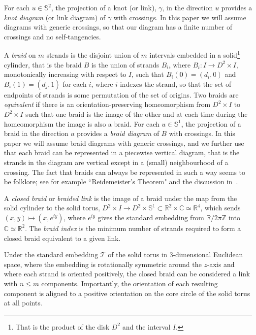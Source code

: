 \documentclass[twoside,leqno]{article}
\newcommand\Sp{\mathbb{S}}
\begin{document}
For each $u \in \Sp^2$, the projection of a knot (or link), $\gamma$, in the direction $u$ provides a \emph{knot diagram} (or link diagram) of $\gamma$ with crossings.  In this paper we will assume diagrams with generic crossings, so that our diagram has a finite number of crossings and no self-tangencies.


A \emph{braid} on $m$ strands is the disjoint union of $m$ intervals embedded in a solid\footnote{That is the product of the disk $D^2$ and the interval $I$.} cylinder, that is the braid $B$ is the union of strands $B_i$, where $B_i\colon I \to D^2\times I$, monotonically increasing with respect to $I$, such that $B_i(0) = (d_i, 0)$ and $B_i(1) = (d_j, 1)$ for each  $i$, where $i$ indexes the strand, so that the set of endpoints of strands is some permutation of the set of origins.
Two braids are \emph{equivalent} if there is an orientation-preserving homeomorphism from $D^2\times I$ to $D^2\times I$ such that one braid is the image of the other and at each time during the homeomorphism the image is also a braid.
For each $u \in \Sp^1$, the projection of a braid in the direction $u$ provides a \emph{braid diagram} of $B$ with crossings.  In this paper we will assume braid diagrams with generic crossings, and we further use that each braid can be represented in a piecewise vertical diagram, that is the strands in the diagram are vertical except in a (small) neighbourhood of a crossing. The fact that braids can always be represented in such a way seems to be folklore; see for example ``Reidemeister’s Theorem" and the discussion in~\cite{Birman2005}.

%

%

\begin{definition} \label{def:ClosedBraid}
    A \emph{closed braid} or \emph{braided link} is the image of a braid under the map from the solid cylinder to the solid torus, $D^2\times I \to D^2 \times \Sp^1 {\subset \mathbb{R}^2 \times \mathbb{C}  \simeq \mathbb{R}^4}$, which sends $(x,y)\mapsto(x,e^{ iy})$, {where $e^{iy}$ gives the standard embedding from $\mathbb{R}/ 2 \pi \mathbb{Z}$ into $\mathbb{C} \simeq \mathbb{R}^2$}. 
    The \emph{braid index} is the minimum number of strands required to form a closed braid equivalent to a given link. 
\end{definition}

    
Under the standard embedding $\mathcal{T}$ of the solid torus in $3$-dimensional Euclidean space, where the embedding is rotationally symmetric around the $z$-axis and where  each strand is oriented positively, the closed braid can be considered a link with $n \leq m$ components.  Importantly, the orientation of each resulting component is aligned to a positive orientation on the core circle of the solid torus at all points. 
\end{document}

